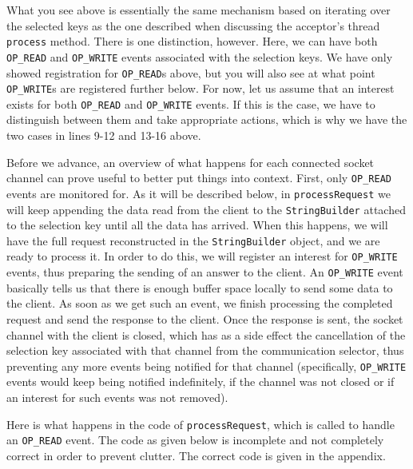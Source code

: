 \documentclass[a4paper,10pt]{article}
\begin{document}
What you see above is essentially the same mechanism based on iterating over the selected keys as the one described when
discussing the acceptor's thread \texttt{process} method. There is one distinction, however. Here, we can have both \texttt{OP\_READ}
and \texttt{OP\_WRITE} events associated with the selection keys. We have only showed registration for \texttt{OP\_READ}s
above, but you will also see at what point \texttt{OP\_WRITE}s are registered further below. For now, let us assume that an
interest exists for both \texttt{OP\_READ} and \texttt{OP\_WRITE} events. If this is the case, we have to distinguish between them and
take appropriate actions, which is why we have the two cases in lines 9-12 and 13-16 above.

Before we advance, an overview of what happens for each connected socket channel can prove useful to better put things into
context. First, only \texttt{OP\_READ} events are monitored for. As it will be described below, in \texttt{processRequest}
we will keep appending the data read from the client to the \texttt{StringBuilder} attached to the selection key until all the
data has arrived. When this happens, we will have the full request reconstructed in the \texttt{StringBuilder} object, and we are
ready to process it. In order to do this, we will register an interest for \texttt{OP\_WRITE} events, thus preparing the sending
of an answer to the client. An \texttt{OP\_WRITE} event basically tells us that there is enough buffer space locally to send some
data to the client. As soon as we get such an event, we finish processing the completed request and send the response to the
client. Once the response is sent, the socket channel with the client is closed, which has as a side effect the cancellation of the
selection key associated with that channel from the communication selector, thus preventing any more events being notified
for that channel (specifically, \texttt{OP\_WRITE} events would keep being notified indefinitely, if the channel was not closed
or if an interest for such events was not removed).

Here is what happens in the code of \texttt{processRequest}, which is called to handle an \texttt{OP\_READ} event. The
code as given below is incomplete and not completely correct in order to prevent clutter. The correct code is given in the
appendix.
\end{document}

